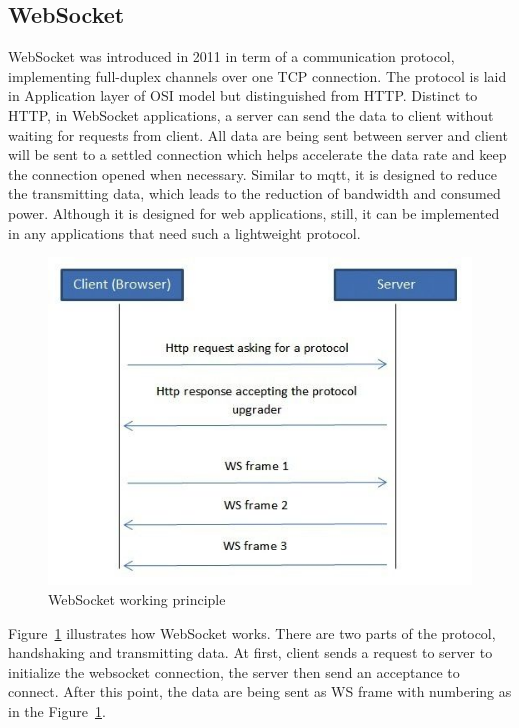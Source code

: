   \subsection{WebSocket}
    WebSocket was introduced in 2011 in term of a communication protocol, implementing full-duplex channels over one TCP connection. The protocol is laid in Application layer of OSI model but distinguished from HTTP. Distinct to HTTP, in WebSocket applications, a server can send the data to client without waiting for requests from client. All data are being sent between server and client will be sent to a settled connection which helps accelerate the data rate and keep the connection opened when necessary. Similar to \gls{mqtt}, it is designed to reduce the transmitting data, which leads to the reduction of bandwidth and consumed power. Although it is designed for web applications, still, it can be implemented in any applications that need such a lightweight protocol.
    \begin{figure}[!ht]
      \begin{center}
        \includegraphics[scale=0.7]{images/ws-1.jpg}
        \caption{WebSocket working principle}
        \label{fig:wsPrinciple}
      \end{center}
    \end{figure}
    Figure~\ref{fig:wsPrinciple} illustrates how WebSocket works. There are two parts of the protocol, handshaking and transmitting data. At first, client sends a request to server to initialize the websocket connection, the server then send an acceptance to connect. After this point, the data are being sent as WS frame with numbering as in the Figure~\ref{fig:wsPrinciple}.

